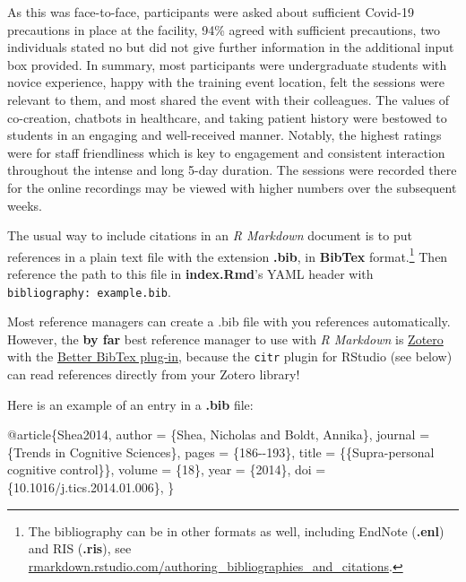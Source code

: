 \documentclass[a4paper, nobind]{templates/ociamthesis}
\newenvironment{Shaded}{\begin{snugshade}}{\end{snugshade}}
\newcommand{\DataTypeTok}[1]{\textcolor[rgb]{0.13,0.29,0.53}{#1}}
\newcommand{\NormalTok}[1]{#1}
\newcommand{\OtherTok}[1]{\textcolor[rgb]{0.56,0.35,0.01}{#1}}
\newcommand{\VariableTok}[1]{\textcolor[rgb]{0.00,0.00,0.00}{#1}}
\renewenvironment{Shaded}
{
  \vspace{10pt}%
  \begin{snugshade}%
}{%
  \end{snugshade}%
  \vspace{8pt}%
}
\begin{document}
As this was face-to-face, participants were asked about sufficient Covid-19 precautions in place at the facility, 94\% agreed with sufficient precautions, two individuals stated no but did not give further information in the additional input box provided.
In summary, most participants were undergraduate students with novice experience, happy with the training event location, felt the sessions were relevant to them, and most shared the event with their colleagues. The values of co-creation, chatbots in healthcare, and taking patient history were bestowed to students in an engaging and well-received manner. Notably, the highest ratings were for staff friendliness which is key to engagement and consistent interaction throughout the intense and long 5-day duration. The sessions were recorded there for the online recordings may be viewed with higher numbers over the subsequent weeks.

The usual way to include citations in an \emph{R Markdown} document is to put references in a plain text file with the extension \textbf{.bib}, in \textbf{BibTex} format.\footnote{The bibliography can be in other formats as well, including EndNote (\textbf{.enl}) and RIS (\textbf{.ris}), see \href{https://rmarkdown.rstudio.com/authoring_bibliographies_and_citations.html}{rmarkdown.rstudio.com/authoring\_bibliographies\_and\_citations}.}
Then reference the path to this file in \textbf{index.Rmd}'s YAML header with \texttt{bibliography:\ example.bib}.

Most reference managers can create a .bib file with you references automatically.
However, the \textbf{by far} best reference manager to use with \emph{R Markdown} is \href{https://www.zotero.org}{Zotero} with the \href{https://retorque.re/zotero-better-bibtex/}{Better BibTex plug-in}, because the \texttt{citr} plugin for RStudio (see below) can read references directly from your Zotero library!

Here is an example of an entry in a \textbf{.bib} file:

\begin{Shaded}
\begin{Highlighting}[]
\VariableTok{@article}\NormalTok{\{}\OtherTok{Shea2014}\NormalTok{,}
  \DataTypeTok{author}\NormalTok{ =        \{Shea, Nicholas and Boldt, Annika\},}
  \DataTypeTok{journal}\NormalTok{ =       \{Trends in Cognitive Sciences\},}
  \DataTypeTok{pages}\NormalTok{ =         \{186{-}{-}193\},}
  \DataTypeTok{title}\NormalTok{ =         \{\{Supra{-}personal cognitive control\}\},}
  \DataTypeTok{volume}\NormalTok{ =        \{18\},}
  \DataTypeTok{year}\NormalTok{ =          \{2014\},}
  \DataTypeTok{doi}\NormalTok{ =           \{10.1016/j.tics.2014.01.006\},}
\NormalTok{\}}
\end{Highlighting}
\end{Shaded}
\end{document}
